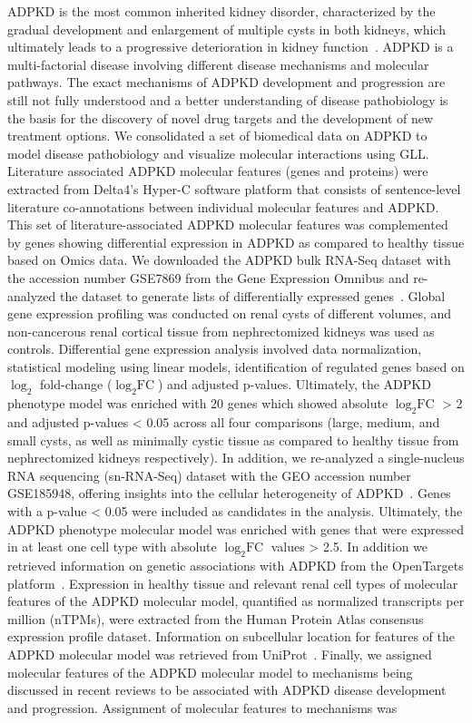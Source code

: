ADPKD is the most common inherited kidney disorder, characterized by the gradual development and enlargement of multiple cysts in both kidneys, which ultimately leads to a progressive deterioration in kidney function~\citep{formicaMolecularPathwaysInvolved2020}. ADPKD is a multi-factorial disease involving different disease mechanisms and molecular pathways. The exact mechanisms of ADPKD development and progression are still not fully understood and a better understanding of disease pathobiology is the basis for the discovery of novel drug targets and the development of new treatment options. We consolidated a set of biomedical data on ADPKD to model disease pathobiology and visualize molecular interactions using GLL. Literature associated ADPKD molecular features (genes and proteins) were extracted from Delta4's Hyper-C software platform that consists of sentence-level literature co-annotations between individual molecular features and ADPKD. This set of literature-associated ADPKD molecular features was complemented by genes showing differential expression in ADPKD as compared to healthy tissue based on Omics data. We downloaded the ADPKD bulk RNA-Seq dataset with the accession number GSE7869 from the Gene Expression Omnibus and re-analyzed the dataset to generate lists of differentially expressed genes~\citep{songSystemsBiologyAutosomal2009}. Global gene expression profiling was conducted on renal cysts of different volumes, and non-cancerous renal cortical tissue from nephrectomized kidneys was used as controls. Differential gene expression analysis involved data normalization, statistical modeling using linear models, identification of regulated genes based on $\log_2$ fold-change ($\log_2 \text{FC}$) and adjusted p-values. Ultimately, the ADPKD phenotype model was enriched with 20 genes which showed absolute $\log_2 \text{FC}$ > 2 and adjusted p-values < 0.05 across all four comparisons (large, medium, and small cysts, as well as minimally cystic tissue as compared to healthy tissue from nephrectomized kidneys respectively). In addition, we re-analyzed a single-nucleus RNA sequencing (sn-RNA-Seq) dataset with the GEO accession number GSE185948, offering insights into the cellular heterogeneity of ADPKD~\citep{mutoDefiningCellularComplexity2022}. Genes with a p-value < 0.05 were included as candidates in the analysis. Ultimately, the ADPKD phenotype molecular model was enriched with genes that were expressed in at least one cell type with absolute $\log_2 \text{FC}$ values > 2.5. In addition we retrieved information on genetic associations with ADPKD from the OpenTargets platform~\citep{bunielloOpenTargetsPlatform2025}. Expression in healthy tissue and relevant renal cell types of molecular features of the ADPKD molecular model, quantified as normalized transcripts per million (nTPMs), were extracted from the Human Protein Atlas consensus expression profile dataset\citep{karlssonSingleCellType2021}. Information on subcellular location for features of the ADPKD molecular model was retrieved from UniProt~\citep{ahmadUniProtWebsiteAPI2025}. Finally, we assigned molecular features of the ADPKD molecular model to mechanisms being discussed in recent reviews to be associated with ADPKD disease development and progression. Assignment of molecular features to mechanisms was 